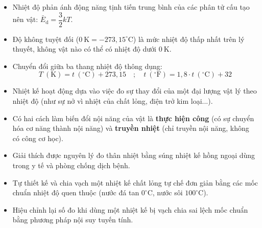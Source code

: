 \begin{emdahoc}
	\begin{itemize}
		\item Nhiệt độ phản ánh động năng tịnh tiến trung bình của các phân tử cấu tạo nên vật: $\bar{E}_{\mathrm{d}} = \dfrac{3}{2} k T$.
		\item Độ không tuyệt đối ($0\ \mathrm{K} = -273{,}15^\circ\mathrm{C}$) là mức nhiệt độ thấp nhất trên lý thuyết, không vật nào có thể có nhiệt độ dưới $0\ \mathrm{K}$.
		\item Chuyển đổi giữa ba thang nhiệt độ thông dụng:
		\[
		T\ (\mathrm{K}) = t\ (^\circ\mathrm{C}) + 273{,}15 \quad ; \quad t\ (^\circ\mathrm{F}) = 1{,}8 \cdot t\ (^\circ\mathrm{C}) + 32
		\]
		\item Nhiệt kế hoạt động dựa vào việc đo sự thay đổi của một đại lượng vật lý theo nhiệt độ (như sự nở vì nhiệt của chất lỏng, điện trở kim loại...).
		\item Có hai cách làm biến đổi nội năng của vật là \textbf{thực hiện công} (có sự chuyển hóa cơ năng thành nội năng) và \textbf{truyền nhiệt} (chỉ truyền nội năng, không có công cơ học).
	\end{itemize}
\end{emdahoc}

\begin{emcothe}
	\begin{itemize}
		\item Giải thích được nguyên lý đo thân nhiệt bằng súng nhiệt kế hồng ngoại dùng trong y tế và phòng chống dịch bệnh.
		\item Tự thiết kế và chia vạch một nhiệt kế chất lỏng tự chế đơn giản bằng các mốc chuẩn nhiệt độ quen thuộc (nước đá tan $0^\circ\mathrm{C}$, nước sôi $100^\circ\mathrm{C}$).
		\item Hiệu chỉnh lại số đo khi dùng một nhiệt kế bị vạch chia sai lệch mốc chuẩn bằng phương pháp nội suy tuyến tính.
	\end{itemize}
\end{emcothe}
